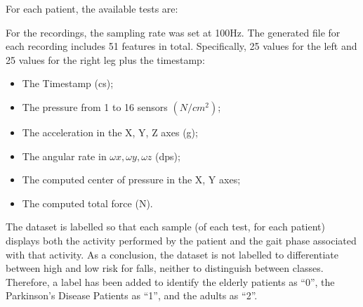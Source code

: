 For each patient, the available tests are:



For the recordings, the sampling rate was set at 100Hz. The generated file for each recording includes 51 features in total. Specifically, 25 values for the left and 25 values for the right leg plus the timestamp:

\begin{itemize}
    \item The Timestamp (cs);
    \item The pressure from 1 to 16 sensors $(N/cm^{2})$;
    \item The acceleration in the X, Y, Z axes (g);
    \item The angular rate in $\omega x, \omega y, \omega z$ (dps);
    \item The computed center of pressure in the X, Y axes; \item The computed total force (N).
\end{itemize}

The dataset is labelled so that each sample (of each test, for each patient) displays both the activity performed by the patient and the gait phase associated with that activity. As a conclusion, the dataset is not labelled to differentiate between high and low risk for falls, neither to distinguish between classes. Therefore, a label has been added to identify the elderly patients as \enquote{0}, the Parkinson's Disease Patients as \enquote{1}, and the adults as \enquote{2}.




